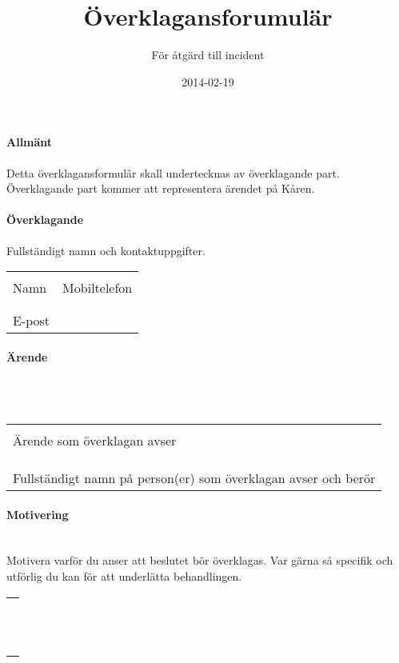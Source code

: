 \documentclass{dtek}
\title{Överklagansforumulär}
\subtitle{För åtgärd till incident}
\date{2014-02-19}
\begin{document}
\makeheadfoot
\maketitle

\paragraph{Allmänt}

Detta överklagansformulär skall undertecknas av överklagande part. Överklagande part kommer att representera ärendet på Kåren.

\paragraph{Överklagande}

Fullständigt namn och kontaktuppgifter.

\begin{tabular}{p{} p{}}
  \\
\hrulefill & \hrulefill \\
Namn & Mobiltelefon\\
\\
\hrulefill & \\
E-post & 
\end{tabular}

\paragraph{Ärende} ~\\
\\
\begin{tabular}{p{\textwidth}}
\hrulefill \\
Ärende som överklagan avser\\
\\
\hrulefill \\
\hrulefill \\
Fullständigt namn på person(er) som överklagan avser och berör
\end{tabular}

\paragraph{Motivering} ~\\
Motivera varför du anser att beslutet bör överklagas. Var gärna så specifik och utförlig du kan för att underlätta behandlingen.\\
\begin{tabular}{p{\textwidth}}
\hrulefill \\
\hrulefill \\
\hrulefill \\
\hrulefill \\
\hrulefill \\
\hrulefill \\
\hrulefill \\
\hrulefill \\
\hrulefill \\
\hrulefill \\
\hrulefill \\
\hrulefill \\
\end{tabular}
\end{document}

